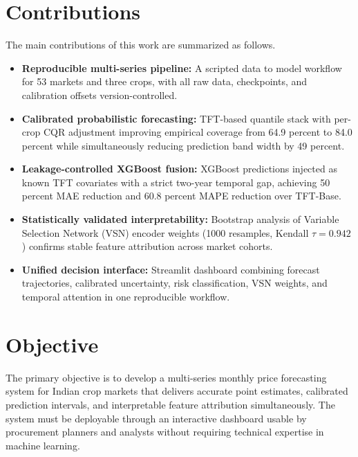 \documentclass[12pt,a4paper]{report}
\begin{document}
\section{Contributions}

The main contributions of this work are summarized as follows.

\begin{itemize}
    \item \textbf{Reproducible multi-series pipeline:} A scripted data to model workflow
    for 53 markets and three crops, with all raw data, checkpoints, and calibration
    offsets version-controlled.

    \item \textbf{Calibrated probabilistic forecasting:} TFT-based quantile stack with
    per-crop CQR adjustment improving empirical coverage from 64.9 percent to 84.0 percent
    while simultaneously reducing prediction band width by 49 percent.

    \item \textbf{Leakage-controlled XGBoost fusion:} XGBoost predictions injected as
    known TFT covariates with a strict two-year temporal gap, achieving 50 percent MAE
    reduction and 60.8 percent MAPE reduction over TFT-Base.

    \item \textbf{Statistically validated interpretability:} Bootstrap analysis of Variable
    Selection Network (VSN) encoder weights (1000 resamples, Kendall $\tau = 0.942$)
    confirms stable feature attribution across market cohorts.

    \item \textbf{Unified decision interface:} Streamlit dashboard combining forecast
    trajectories, calibrated uncertainty, risk classification, VSN weights, and temporal
    attention in one reproducible workflow.
\end{itemize}

\section{Objective}

The primary objective is to develop a multi-series monthly price forecasting system for
Indian crop markets that delivers accurate point estimates, calibrated prediction intervals,
and interpretable feature attribution simultaneously. The system must be deployable through
an interactive dashboard usable by procurement planners and analysts without requiring
technical expertise in machine learning.
\end{document}
